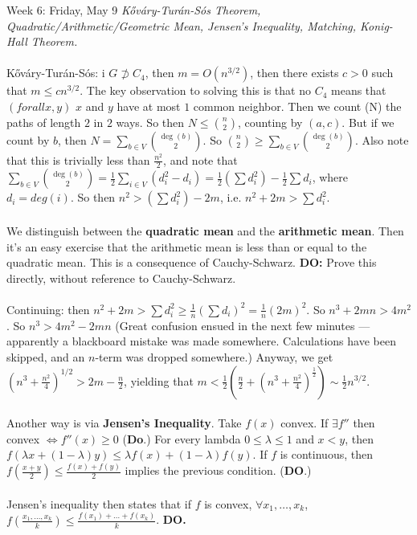 \documentclass[12pt]{article}
\theoremstyle{remark}
\begin{document}
\newpage
\label{18}\begin{section}{Week 6: Friday, May 9}
\indent\textit{K\H{o}v\'ary-Tur\'an-S\'os Theorem, Quadratic/Arithmetic/Geometric Mean, Jensen's Inequality, Matching, Konig-Hall Theorem.}\\\\
K\H{o}v\'ary-Tur\'an-S\'os: i $G \not \supset C_4$, then $m = O(n^{3/2})$, then there exists $c > 0$ such that $m \leq cn^{3/2}$. The key observation to solving this is that no $C_4$ means that $(forall x,y)$ $x$ and $y$ have at most $1$ common neighbor. Then we count (N) the paths of length $2$ in $2$ ways. So then $N \leq {n \choose 2}$, counting by $(a,c)$. But if we count by $b$, then $N = \sum_{b \in V} {\deg(b) \choose 2}$. So ${n \choose 2} \geq \sum_{b \in V} {\deg(b) \choose 2}$. Also note that this is trivially less than $\frac{n^2}{2}$, and note that $\sum_{b \in V} {\deg(b) \choose 2} = \frac 12 \sum_{i \in V} (d_i^2-d_i) = \frac 12 (\sum d_i^2) - \frac 12 \sum d_i$, where $d_i = deg(i)$. So then $n^2 > (\sum d_i^2) - 2m$, i.e. $n^2 + 2m > \sum d_i^2$.
\\\\
We distinguish between the \textbf{quadratic mean} and the \textbf{arithmetic mean}. Then it's an easy exercise that the arithmetic mean is less than or equal to the quadratic mean. This is a consequence of Cauchy-Schwarz. \textbf{DO:} Prove this directly, without reference to Cauchy-Schwarz.
\\\\
Continuing: then $n^2 + 2m > \sum d_i^2 \geq \frac 1n (\sum d_i)^2 = \frac 1n (2m)^2$. So $n^3 + 2mn > 4m^2$. So $n^3 > 4m^2 - 2mn$ (Great confusion ensued in the next few minutes --- apparently a blackboard mistake was made somewhere. Calculations have been skipped, and an $n$-term was dropped somewhere.) Anyway, we get $(n^3 + \frac{n^2}{4})^{1/2} > 2m - \frac n 2$, yielding that $m < \frac 12 (\frac n 2 + (n^3 + \frac{n^2}{4})^\frac{1}{2}) \sim \frac 1 2 n^{3/2}$.
\\\\
Another way is via \textbf{Jensen's Inequality}. Take $f(x)$ convex. If $\exists f''$ then convex $\Leftrightarrow f''(x) \geq 0$ (\textbf{Do}.) For every lambda $0 \leq \lambda \leq 1$ and $x<y$, then $f(\lambda x + (1-\lambda)y) \leq \lambda f(x) + (1-\lambda)f(y)$. If $f$ is continuous, then $f(\frac{x+y}{2}) \leq \frac{f(x)+f(y)}{2}$ implies the previous condition. (\textbf{DO}.)
\\\\
Jensen's inequality then states that if $f$ is convex, $\forall x_1,\ldots,x_k$, $f(\frac{x_1,\ldots,x_k}{k}) \leq \frac{f(x_1)+\ldots+f(x_k)}{k}$. \textbf{DO.} \\\\

\end{section}
\end{document}
